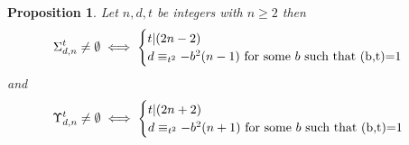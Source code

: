 \documentclass{article}
\newtheorem{proposition}{Proposition}[section]
\begin{document}
\begin{proposition}\label{prop_char_of_non_emptyness}
    Let $n,d,t$ be integers with $n\geq 2$ then
    \begin{equation*}\Sigma_{d,n}^t\neq \emptyset \iff 
        \begin{cases}
            t|(2n-2)\\
            d\equiv_{t^2}-b^2(n-1) \text{ for some } b \text{ such that } $(b,t)=1$
        \end{cases}
    \end{equation*}
    and 
    \begin{equation*}\Upsilon_{d,n}^t\neq \emptyset \iff 
        \begin{cases}
            t|(2n+2)\\
            d\equiv_{t^2}-b^2(n+1) \text{ for some } b \text{ such that } $(b,t)=1$
        \end{cases}
    \end{equation*}
\end{proposition}
\end{document}
